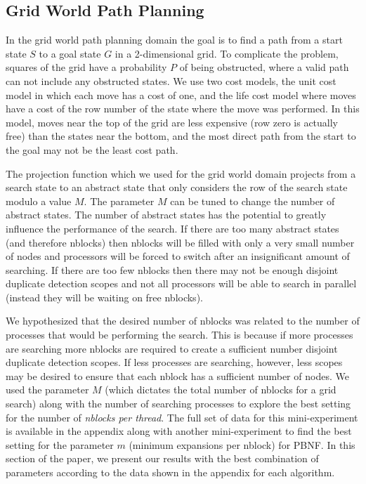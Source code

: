 \documentclass{article}
\begin{document}

\subsection{Grid World Path Planning}

In the grid world path planning domain the goal is to find a path from
a start state $S$ to a goal state $G$ in a 2-dimensional grid.  To
complicate the problem, squares of the grid have a probability $P$ of
being obstructed, where a valid path can not include any obstructed
states.  We use two cost models, the unit cost model in which each
move has a cost of one, and the life cost model where moves have a
cost of the row number of the state where the move was performed.  In
this model, moves near the top of the grid are less expensive (row
zero is actually free) than the states near the bottom, and the most
direct path from the start to the goal may not be the least cost path.

The projection function which we used for the grid world domain
projects from a search state to an abstract state that only considers
the row of the search state modulo a value $M$.  The parameter $M$ can
be tuned to change the number of abstract states.  The number of
abstract states has the potential to greatly influence the performance
of the search.  If there are too many abstract states (and therefore
nblocks) then nblocks will be filled with only a very small number of
nodes and processors will be forced to switch after an insignificant
amount of searching.  If there are too few nblocks then there may not
be enough disjoint duplicate detection scopes and not all processors
will be able to search in parallel (instead they will be waiting on
free nblocks).

We hypothesized that the desired number of nblocks was related to the
number of processes that would be performing the search.  This is
because if more processes are searching more nblocks are required to
create a sufficient number disjoint duplicate detection scopes.  If
less processes are searching, however, less scopes may be desired to
ensure that each nblock has a sufficient number of nodes.  We used the
parameter $M$ (which dictates the total number of nblocks for a grid
search) along with the number of searching processes to explore the
best setting for the number of \emph{nblocks per thread}.  The full
set of data for this mini-experiment is available in the appendix
along with another mini-experiment to find the best setting for the
parameter $m$ (minimum expansions per nblock) for PBNF.  In this
section of the paper, we present our results with the best combination
of parameters according to the data shown in the appendix for each
algorithm.
\end{document}
